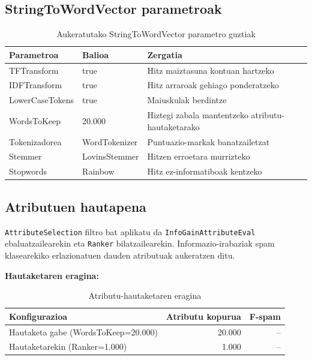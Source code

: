 \documentclass[12pt, a4paper]{article}
\begin{document}
\subsection{StringToWordVector parametroak}

\begin{table}[H]
    \centering
    \caption{Aukeratutako StringToWordVector parametro guztiak}
    \begin{tabular}{lll}
        \toprule
        \textbf{Parametroa} & \textbf{Balioa} & \textbf{Zergatia} \\
        \midrule
        TFTransform     & true   & Hitz maiztasuna kontuan hartzeko \\
        IDFTransform    & true   & Hitz arraroak gehiago ponderatzeko \\
        LowerCaseTokens & true   & Maiuskulak berdintze \\
        WordsToKeep     & 20.000 & Hiztegi zabala mantentzeko atributu-hautaketarako \\
        Tokenizadorea   & WordTokenizer & Puntuazio-markak banatzailetzat \\
        Stemmer         & LovinsStemmer & Hitzen erroetara murrizteko \\
        Stopwords       & Rainbow & Hitz ez-informatiboak kentzeko \\
        \bottomrule
    \end{tabular}
    \label{tab:stwv}
\end{table}

\subsection{Atributuen hautapena}

\texttt{AttributeSelection} filtro bat aplikatu da \texttt{InfoGainAttributeEval}
ebaluatzailearekin eta \texttt{Ranker} bilatzailearekin. Informazio-irabaziak
spam klasearekiko erlazionatuen dauden atributuak aukeratzen ditu.

\textbf{Hautaketaren eragina:}

\begin{table}[H]
    \centering
    \caption{Atributu-hautaketaren eragina}
    \begin{tabular}{lrr}
        \toprule
        \textbf{Konfigurazioa} & \textbf{Atributu kopurua} & \textbf{F-spam} \\
        \midrule
        Hautaketa gabe (WordsToKeep=20.000) & 20.000 & -- \\
        Hautaketarekin (Ranker=1.000)       & 1.000  & -- \\
        \bottomrule
    \end{tabular}
    \label{tab:hautaketa}
\end{table}
\end{document}
